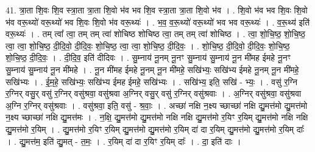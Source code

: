 \documentclass[17pt]{extarticle}
\begin{document}
41. त्रा॒ता शि॒वः शि॒व स्त्रा॒ता त्रा॒ता शि॒वो भ॑व भव शि॒व स्त्रा॒ता त्रा॒ता शि॒वो भ॑व । . शि॒वो भ॑व भव शि॒वः शि॒वो भ॑व वरू॒थ्यो॑ वरू॒थ्यो॑ भव शि॒वः शि॒वो भ॑व वरू॒थ्यः॑ । . भ॒व॒ व॒रू॒थ्यो॑ वरू॒थ्यो॑ भव भव वरू॒थ्यः॑ । . व॒रू॒थ्य॑ इति॑ वरू॒थ्यः॑ । . तम् त्वा᳚ त्वा॒ तम् तम् त्वा॑ शोचिष्ठ शोचिष्ठ त्वा॒ तम् तम् त्वा॑ शोचिष्ठ । . त्वा॒ शो॒चि॒ष्ठ॒ शो॒चि॒ष्ठ॒ त्वा॒ त्वा॒ शो॒चि॒ष्ठ॒ दी॒दि॒वो॒ दी॒दि॒वः॒ शो॒चि॒ष्ठ॒ त्वा॒ त्वा॒ शो॒चि॒ष्ठ॒ दी॒दि॒वः॒ । . शो॒चि॒ष्ठ॒ दी॒दि॒वो॒ दी॒दि॒वः॒ शो॒चि॒ष्ठ॒ शो॒चि॒ष्ठ॒ दी॒दि॒वः॒ । . दी॒दि॒व॒ इति॑ दीदिवः । . सु॒म्नाय॑ नू॒नम् नू॒नꣳ सु॒म्नाय॑ सु॒म्नाय॑ नू॒न मी॑मह ईमहे नू॒नꣳ सु॒म्नाय॑ सु॒म्नाय॑ नू॒न मी॑महे । . नू॒न मी॑मह ईमहे नू॒नम् नू॒न मी॑महे॒ सखि॑भ्यः॒ सखि॑भ्य ईमहे नू॒नम् नू॒न मी॑महे॒ सखि॑भ्यः । . ई॒म॒हे॒ सखि॑भ्यः॒ सखि॑भ्य ईमह ईमहे॒ सखि॑भ्यः । . सखि॑भ्य॒ इति॒ सखि॑ - भ्यः॒ । . वसु॑ र॒ग्नि र॒ग्निर् वसु॒र् वसु॑ र॒ग्निर् वसु॑श्रवा॒ वसु॑श्रवा अ॒ग्निर् वसु॒र् वसु॑ र॒ग्निर् वसु॑श्रवाः । . अ॒ग्निर् वसु॑श्रवा॒ वसु॑श्रवा अ॒ग्नि र॒ग्निर् वसु॑श्रवाः । . वसु॑श्रवा॒ इति॒ वसु॑ - श्र॒वाः॒ । . अच्छा॑ नक्षि न॒क्ष्य च्छाच्छा॑ नक्षि द्यु॒मत्त॑मो द्यु॒मत्त॑मो न॒क्ष्य च्छाच्छा॑ नक्षि द्यु॒मत्त॑मः । . न॒क्षि॒ द्यु॒मत्त॑मो द्यु॒मत्त॑मो नक्षि नक्षि द्यु॒मत्त॑मो र॒यिꣳ र॒यिम् द्यु॒मत्त॑मो नक्षि नक्षि द्यु॒मत्त॑मो र॒यिम् । . द्यु॒मत्त॑मो र॒यिꣳ र॒यिम् द्यु॒मत्त॑मो द्यु॒मत्त॑मो र॒यिम् दा॑ दा र॒यिम् द्यु॒मत्त॑मो द्यु॒मत्त॑मो र॒यिम् दाः᳚ । . द्यु॒मत्त॑म॒ इति॑ द्यु॒मत् - त॒मः॒ । . र॒यिम् दा॑ दा र॒यिꣳ र॒यिम् दाः᳚ । . दा॒ इति॑ दाः । \newline
\pagebreak
{}
\end{document}
